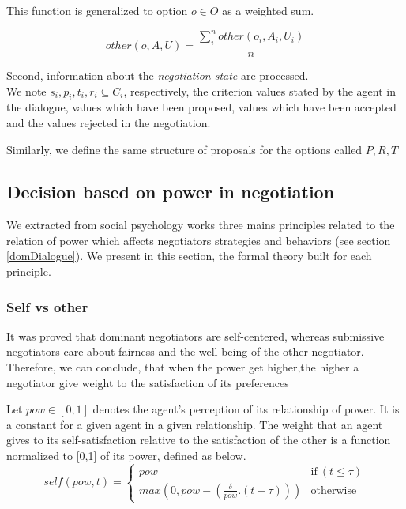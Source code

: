 \documentclass{llncs}
\begin{document}
	This function is generalized to option $o \in O$ as a weighted sum.
	
	\begin{equation}
	other(o, A, U) = \frac{ \sum_{i}^{n} other(o_i, A_i, U_i) } {n}
	\end{equation}
	
	Second, information about the \textit{negotiation state} are processed. \\
	We note  $s_i, p_i, t_i, r_i \subseteq C_i$, respectively, the criterion values stated by the agent in the dialogue, values which have been proposed, values which have been accepted and the values rejected in the negotiation. 
		
	Similarly, we define the same structure of proposals for the options called $P, R, T$
	
	\subsection{Decision based on power in negotiation}
	\label{decision}
	We extracted from social psychology works three mains principles related to the relation of power which affects negotiators strategies and behaviors (see section \ref{domDialogue}). We present in this section, the formal theory built for each principle. 
	
	\subsubsection {Self vs other}
		It was proved that dominant negotiators are self-centered, whereas submissive negotiators care about fairness and the well being of the other negotiator. Therefore, we can conclude, that when the power get higher,the higher a negotiator give weight to the satisfaction of its preferences 
	
		Let  $pow \in [0, 1] $ denotes the agent's perception of its relationship of power. It is a constant for a given agent in a given relationship.
	The weight that an agent gives to its self-satisfaction relative to	the satisfaction of the other is a function normalized to 	[0,1] of its power, defined as below.
	\begin{equation}
		self(pow, t) = \left\{\begin{array}{ll}
		pow & \mathrm{if\ } (t \leq \tau)\\
		max(0, pow - (\frac{\delta}{pow} . (t - \tau))) & \mathrm{otherwise}
		\end{array}\right.
	\end{equation}
	
\end{document}

